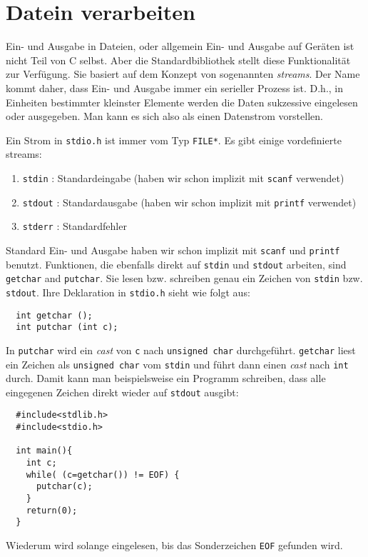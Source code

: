 \section{Datein verarbeiten}

Ein- und Ausgabe in Dateien, oder allgemein Ein- und Ausgabe auf Geräten ist nicht Teil von C selbst.
Aber die Standardbibliothek stellt diese Funktionalität zur Verfügung.
Sie basiert auf dem Konzept von sogenannten \emph{streams}.
Der Name kommt daher, dass Ein- und Ausgabe immer ein serieller Prozess ist.
D.h., in Einheiten bestimmter kleinster Elemente werden die Daten sukzessive eingelesen oder ausgegeben.
Man kann es sich also als einen Datenstrom vorstellen.

Ein Strom in \verb|stdio.h| ist immer vom Typ \verb|FILE*|.
Es gibt einige vordefinierte streams:
\begin{enumerate}
\item \verb|stdin| : Standardeingabe (haben wir schon implizit mit \texttt{scanf} verwendet) 
\item \texttt{stdout} : Standardausgabe (haben wir schon implizit mit \texttt{printf} verwendet) 
\item \texttt{stderr} : Standardfehler
\end{enumerate} 
Standard Ein- und Ausgabe haben wir schon implizit mit \texttt{scanf} und \texttt{printf} benutzt.
Funktionen, die ebenfalls direkt auf \verb|stdin| und \texttt{stdout} arbeiten, sind \verb|getchar| and \verb|putchar|.
Sie lesen bzw. schreiben genau ein Zeichen von \verb|stdin| bzw. \texttt{stdout}.
Ihre Deklaration in \verb|stdio.h| sieht wie folgt aus:
\begin{lstlisting}
  int getchar ();
  int putchar (int c);
\end{lstlisting}
In \verb|putchar| wird ein \emph{cast} von \verb|c| nach \verb|unsigned char| durchgeführt.
\verb|getchar| liest ein Zeichen als \verb|unsigned char| vom \verb|stdin| und führt dann einen \emph{cast} nach \verb|int| durch.
Damit kann man beispielsweise ein Programm schreiben, dass alle eingegenen Zeichen direkt wieder auf \texttt{stdout} ausgibt:
\begin{lstlisting}
  #include<stdlib.h>
  #include<stdio.h>
  
  int main(){
    int c;
    while( (c=getchar()) != EOF) {
      putchar(c);
    }
    return(0);
  }
\end{lstlisting}
Wiederum wird solange eingelesen, bis das Sonderzeichen \verb|EOF| gefunden wird.

